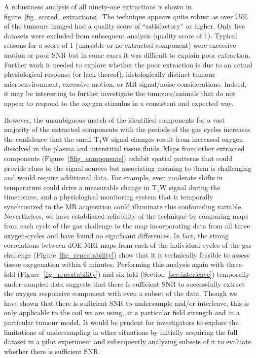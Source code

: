 A robustness analysis of all ninety-one extractions is shown in figure~\ref{fig_scored_extractions}.
The technique appears quite robust as over 75\% of the tumours imaged had a quality score of ``satisfactory'' or higher.
Only five datasets were excluded from subsequent analysis (quality score of 1).
Typical reasons for a score of 1 (unusable or no extracted component) were excessive motion or poor SNR but in some cases it was difficult to explain poor extraction.
Further work is needed to explore whether the poor extraction is due to an actual physiological response (or lack thereof), histologically distinct tumour microenvironment, excessive motion, or MR signal/noise considerations.
Indeed, it may be interesting to further investigate the tumours/animals that do not appear to respond to the oxygen stimulus in a consistent and expected way.

However, the unambiguous match of the identified components for a vast majority of the extracted components with the periods of the gas cycles increases the confidence that the small T$_1$W signal changes result from increased oxygen dissolved in the plasma and interstitial tissue fluids.
Maps from other extracted components (Figure~\ref{Sfig_components}) exhibit spatial patterns that could provide clues to the signal sources but associating meaning to them is challenging and would require additional data.
For example, even moderate shifts in temperature could drive a measurable change in T$_1$W signal during the timecourse, and a physiological monitoring system that is temporally synchronized to the MR acquisition could illuminate this confounding variable. 
Nevertheless, we have established reliability of the technique by comparing maps from each cycle of the gas challenge to the map incorporating data from all three oxygen-cycles and have found no significant differences.
In fact, the strong correlations between \acs{dOE-MRI} maps from each of the individual cycles of the gas challenge (Figure~\ref{fig_repeatability}) show that it is technically feasible to assess tissue oxygenation within 6 minutes.
Performing this analysis again with three-fold (Figure~\ref{fig_repeatability}) and six-fold (Section~\ref{sec:interleave}) temporally under-sampled data suggests that there is sufficient \acs{SNR} to successfully extract the oxygen responsive component  with even a subset of the data.
Though we have shown that there is sufficient SNR to undersample and/or interleave, this is only applicable to the coil we are using, at a particular field strength and in a particular tumour model. 
It would be prudent for investigators to explore the limitations of undersampling in other situations by initially acquiring the full dataset in a pilot experiment and subsequently analyzing subsets of it to evaluate whether there is sufficient SNR.

